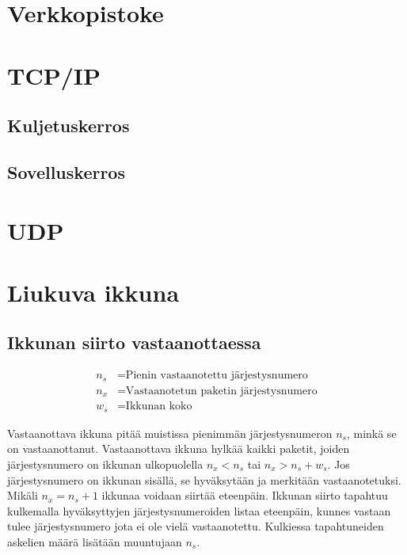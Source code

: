 \documentclass[a4paper,12pt]{article}
\begin{document}
    \section{Verkkopistoke}\label{sec:verkkopistoke}
    \blindtext


            \section{TCP/IP}\label{sec:tcpip}
            \blindtext

            \subsection{Kuljetuskerros}\label{subsec:kuljetuskerros}
            \blindtext

            \subsection{Sovelluskerros}\label{subsec:sovelluskerros}
            \blindtext




        \section{UDP}\label{sec:udp}
        \blindtext



        \section{Liukuva ikkuna}\label{sec:liukuva_ikkuna}
        \blindtext

        \subsection{Ikkunan siirto vastaanottaessa}

\begin{align}
    n_s &= \text{Pienin vastaanotettu järjestysnumero} \\
    n_x &= \text{Vastaanotetun paketin järjestysnumero} \\
    w_s &= \text{Ikkunan koko}
\end{align}

Vastaanottava ikkuna pitää muistissa pienimmän järjestysnumeron $n_s$, minkä se on vastaanottanut.
Vastaanottava ikkuna hylkää kaikki paketit, joiden järjestysnumero on ikkunan ulkopuolella $n_x < n_s$ tai $n_x > n_s + w_s$. Jos järjestysnumero on ikkunan sisällä, se hyväksytään ja merkitään vastaanotetuksi. Mikäli $n_x = n_s + 1$ ikkunaa voidaan siirtää eteenpäin.
Ikkunan siirto tapahtuu kulkemalla hyväksyttyjen järjestysnumeroiden listaa eteenpäin, kunnes vastaan tulee järjestysnumero jota ei ole vielä vastaanotettu. Kulkiessa tapahtuneiden askelien määrä lisätään muuntujaan $n_s$.
\end{document}
